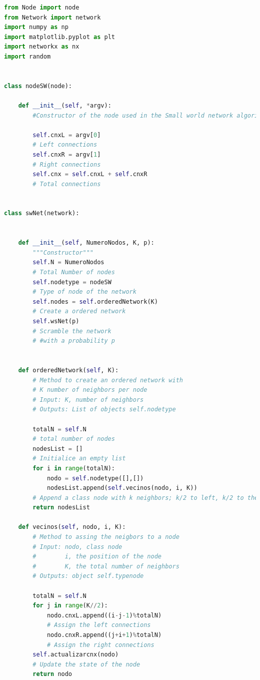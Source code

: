 \documentclass{article}
\begin{document}
\begin{lstlisting}[language=Python, caption= Small World Network Class]
from Node import node
from Network import network
import numpy as np
import matplotlib.pyplot as plt
import networkx as nx
import random


class nodeSW(node):
    
    def __init__(self, *argv):
        #Constructor of the node used in the Small world network algorithm. The right connections correspond to those that we are going to reconnect. The left connections correspond to those that are going to be eliminated.

        self.cnxL = argv[0]
        # Left connections 
        self.cnxR = argv[1]
        # Right connections 
        self.cnx = self.cnxL + self.cnxR
        # Total connections 

                        
class swNet(network):


    def __init__(self, NumeroNodos, K, p):
        """Constructor""" 
        self.N = NumeroNodos
        # Total Number of nodes
        self.nodetype = nodeSW
        # Type of node of the network
        self.nodes = self.orderedNetwork(K)
        # Create a ordered network
        self.wsNet(p)
        # Scramble the network 
        # #with a probability p
        

    def orderedNetwork(self, K):
        # Method to create an ordered network with
        # K number of neighbors per node
        # Input: K, number of neighbors
        # Outputs: List of objects self.nodetype

        totalN = self.N
        # total number of nodes
        nodesList = []
        # Initialice an empty list
        for i in range(totalN):
            nodo = self.nodetype([],[])
            nodesList.append(self.vecinos(nodo, i, K))
        # Append a class node with k neighbors; k/2 to left, k/2 to the right
        return nodesList

    def vecinos(self, nodo, i, K):
        # Method to assing the neigbors to a node
        # Input: nodo, class node
        #        i, the position of the node
        #        K, the total number of neighbors
        # Outputs: object self.typenode
                            
        totalN = self.N
        for j in range(K//2):
            nodo.cnxL.append((i-j-1)%totalN)
            # Assign the left connections
            nodo.cnxR.append((j+i+1)%totalN)
            # Assign the right connections
        self.actualizarcnx(nodo)
        # Update the state of the node 
        return nodo


\end{lstlisting}
\end{document}
